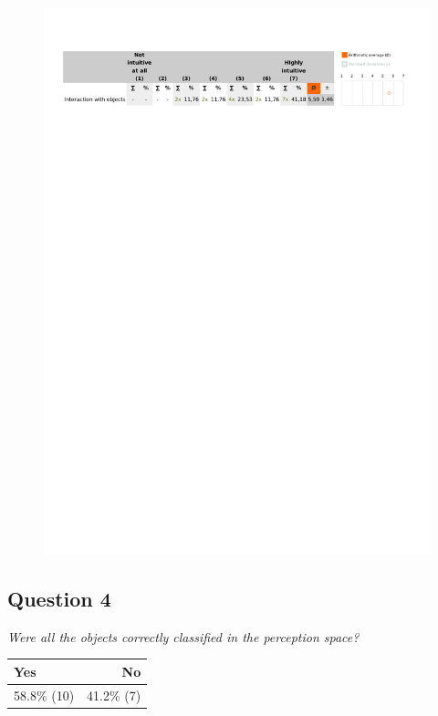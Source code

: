 \begin{figure}[H]
	\centering
	\includegraphics[width=0.6\linewidth]{gfx/Chapter_EvaluationResults/ALFTask/question3}
\end{figure}

\subsection{Question 4}\label{question1:4}
\emph{Were all the objects correctly classified in the perception space?}
\begin{table}[H]
	\begin{center}
		\small \begin{tabular*}{0.35\columnwidth}{lr}
			\\ \hline \hline
			Yes & No \\ \hline \hline

		 	58.8\% (10) & 41.2\% (7)\\ \hline
		\end{tabular*}
	\end{center}
\end{table}

